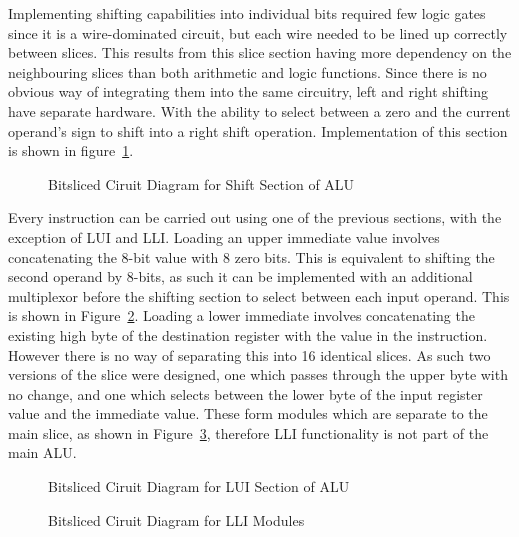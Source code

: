 Implementing shifting capabilities into individual bits required few logic gates since it is a wire-dominated circuit, but each wire needed to be lined up correctly between slices. This results from this slice section having more dependency on the neighbouring slices than both arithmetic and logic functions. Since there is no obvious way of integrating them into the same circuitry, left and right shifting have separate hardware. With the ability to select between a zero and the current operand's sign to shift into a right shift operation. Implementation of this section is shown in figure~\ref{fig:ShiftSlice}. 

\begin{figure}[h]
	\caption{Bitsliced Ciruit Diagram for Shift Section of ALU}
	\label{fig:ShiftSlice}
\end{figure}

Every instruction can be carried out using one of the previous sections, with the exception of LUI and LLI. Loading an upper immediate value involves concatenating the 8-bit value with 8 zero bits. This is equivalent to shifting the second operand by 8-bits, as such it can be implemented with an additional multiplexor before the shifting section to select between each input operand. This is shown in Figure~\ref{fig:LUISlice}. Loading a lower immediate involves concatenating the existing high byte of the destination register with the value in the instruction. However there is no way of separating this into 16 identical slices. As such two versions of the slice were designed, one which passes through the upper byte with no change, and one which selects between the lower byte of the input register value and the immediate value. These form modules which are separate to the main slice, as shown in Figure~\ref{fig:LLISlices}, therefore LLI functionality is not part of the main ALU. 

\begin{figure}[h]
	\caption{Bitsliced Ciruit Diagram for LUI Section of ALU}
	\label{fig:LUISlice}
\end{figure}

\begin{figure}[h]
	\caption{Bitsliced Ciruit Diagram for LLI Modules}
	\label{fig:LLISlices}
\end{figure}

